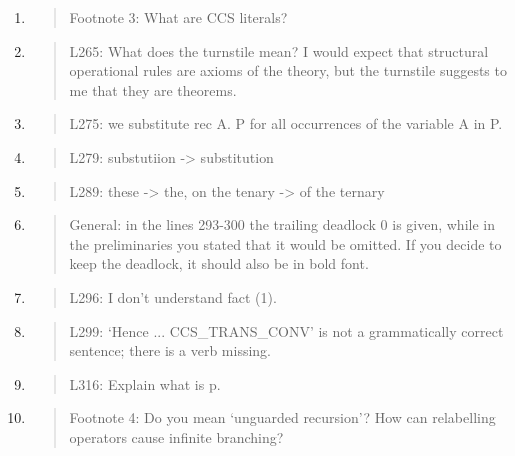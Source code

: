 \begin{enumerate}
\item \begin{quote}
    Footnote 3: What are CCS literals?
  \end{quote}

\item \begin{quote}
    L265: What does the turnstile mean? I would expect that structural
    operational rules are axioms of the theory, but the turnstile
    suggests to me that they are theorems.
  \end{quote}

\item \begin{quote}
    L275: we substitute rec A. P for all occurrences of the variable A in P.
  \end{quote}

\item \begin{quote}
    L279: substutiion -> substitution
  \end{quote}

\item \begin{quote}
    L289: these -> the, on the tenary -> of the ternary
  \end{quote}

\item \begin{quote}
    General: in the lines 293-300 the trailing deadlock 0 is given,
    while in the preliminaries you stated that it would be omitted. If
    you decide to keep the deadlock, it should also be in bold font.
  \end{quote}

\item \begin{quote}
    L296: I don’t understand fact (1).
  \end{quote}

\item \begin{quote}
    L299: ‘Hence ... CCS_TRANS_CONV’ is not a grammatically correct sentence; there is a verb missing.
  \end{quote}

\item \begin{quote}
    L316: Explain what is p.
  \end{quote}

\item \begin{quote}
    Footnote 4: Do you mean ‘unguarded recursion’? How can relabelling operators cause infinite branching?
  \end{quote}


\end{enumerate}
